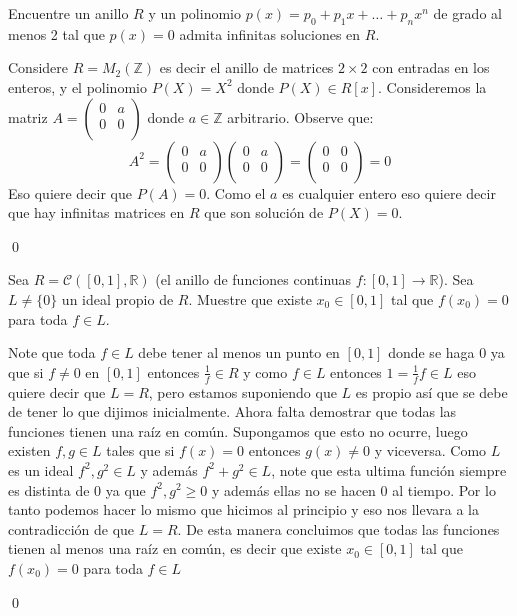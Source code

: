 \begin{homeworkProblem}
 Encuentre un anillo $R$ y un polinomio $p(x)=p_0+p_1x+\dots+p_nx^n$ de grado al menos 2 tal que $p(x)=0$ admita infinitas soluciones en $R.$
 \begin{solucion}
     Considere $R=M_2(\mathbb{Z})$ es decir el anillo de matrices $2\times2$ con entradas en los enteros, y el polinomio $P(X)=X^2$ donde $P(X)\in R[x]$. Consideremos la matriz $A=\begin{pmatrix}
         0&a\\
         0&0\\
     \end{pmatrix}$ donde $a\in\mathbb{Z}$ arbitrario. Observe que:
     $$A^2=\begin{pmatrix}
         0&a\\
         0&0\\
     \end{pmatrix}\begin{pmatrix}
         0&a\\
         0&0\\
     \end{pmatrix}=\begin{pmatrix}
         0&0\\
         0&0\\
     \end{pmatrix}=0$$
     Eso quiere decir que $P(A)=0$. Como el $a$ es cualquier entero eso quiere decir que hay infinitas matrices en $R$ que son solución de $P(X)=0$.
     
     \qed
 \end{solucion}
\end{homeworkProblem}

\newpage
\begin{homeworkProblem}
 Sea $R=\mathcal{C}([0,1],\mathbb{R})$ (el anillo de funciones continuas $f:[0,1]\rightarrow\mathbb{R}$). Sea $L\neq\{0\}$ un ideal propio de $R$. Muestre que existe $x_0\in[0,1]$ tal que $f(x_0)=0$ para toda $f\in L.$
 \begin{solucion}
     Note que toda $f\in L$ debe tener al menos un punto en $[0,1]$ donde se haga 0 ya que si $f\neq 0$ en $[0,1]$ entonces $\frac{1}{f}\in R$ y como $f\in L$ entonces $1=\frac{1}{f}f\in L$ eso quiere decir que $L=R$, pero estamos suponiendo que $L$ es propio así que se debe de tener lo que dijimos inicialmente. Ahora falta demostrar que todas las funciones tienen una raíz en común. Supongamos que esto no ocurre, luego existen $f,g\in L$ tales que si $f(x)=0$ entonces $g(x)\neq 0$ y viceversa. Como $L$ es un ideal $f^2,g^2\in L$ y además $f^2+g^2\in L$, note que esta ultima función siempre es distinta de $0$ ya que $f^2,g^2\geq 0$ y además ellas no se hacen 0 al tiempo. Por lo tanto podemos hacer lo mismo que hicimos al principio y eso nos llevara a la contradicción de que $L=R.$ De esta manera concluimos que todas las funciones tienen al menos una raíz en común, es decir que existe $x_0\in[0,1]$ tal que $f(x_0)=0$ para toda $f\in L$

     \qed
 \end{solucion}
\end{homeworkProblem}

